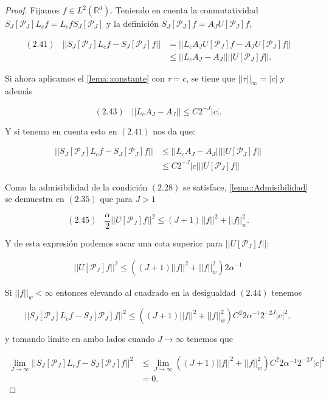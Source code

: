\begin{proof}

\noindent Fijamos $f\in L^2(\mathbb{R}^d)$. Teniendo en cuenta la conmutatividad $S_J[\mathcal{P}_J] L_cf = L_cf S_J[\mathcal{P}_J]$ y la definición $S_J[\mathcal{P}_J]f=A_J U[\mathcal{P}_J]f$,

\begin{align*}
    (2.41) \;\;\; ||S_J[\mathcal{P}_J] L_cf - S_J[\mathcal{P}_J]f || &= ||L_c A_J U[\mathcal{P}_J]f - A_J U[\mathcal{P}_J]f|| \\
    &\leq ||L_c A_J - A_J|| ||U[\mathcal{P}_J]f||.
\end{align*}

\medskip

\noindent Si ahora aplicamos el \autoref{lema::constante} con $\tau=c$, se tiene que $||\tau||_\infty=|c|$ y además

$$(2.43) \;\;\; ||L_c A_J - A_J|| \leq C 2^{-J} |c|.$$

\noindent Y si tenemo en cuenta esto en $(2.41)$ nos da que: 

\begin{align*}
  ||S_J[\mathcal{P}_J] L_cf - S_J[\mathcal{P}_J]f || & \leq ||L_c A_J - A_J|| ||U[\mathcal{P}_J]f|| \\
  & \leq C 2^{-J} |c| ||U[\mathcal{P}_J]f||
\end{align*}

\noindent Como la admisibilidad de la condición $(2.28)$ se satisface, \autoref{lema::Admisibilidad} se demuestra en $(2.35)$ que para $J>1$

$$(2.45) \;\;\; \frac{\alpha}{2}||U[\mathcal{P}_J]f||^2 \leq (J+1)||f||^2+||f||^2_w.$$

\noindent Y de esta expresión podemos sacar una cota superior para $||U[\mathcal{P}_J]f||$: 

\begin{align*}
  ||U[\mathcal{P}_J]f||^2 \leq ((J+1)||f||^2+||f||^2_w) 2 \alpha^{-1}
\end{align*}

\noindent Si $||f||_w < \infty$ entonces elevando al cuadrado en la desigualdad $(2.44)$ tenemos

$$||S_J[\mathcal{P}_J] L_cf - S_J[\mathcal{P}_J]f ||^2 \leq ((J+1)||f||^2+||f||_w^2)C^2 2 \alpha^{-1} 2^{-2J} |c|^2,$$

\noindent y tomando límite en ambo lados cuando $J\rightarrow \infty$ tenemos que 

\begin{align*}
  \lim_{J\rightarrow \infty} ||S_J[\mathcal{P}_J] L_cf - S_J[\mathcal{P}_J]f ||^2 &\leq \lim_{J\rightarrow \infty} ((J+1)||f||^2+||f||_w^2)C^2 2 \alpha^{-1} 2^{-2J} |c|^2 \\
  &= 0.
\end{align*}


\end{proof}
